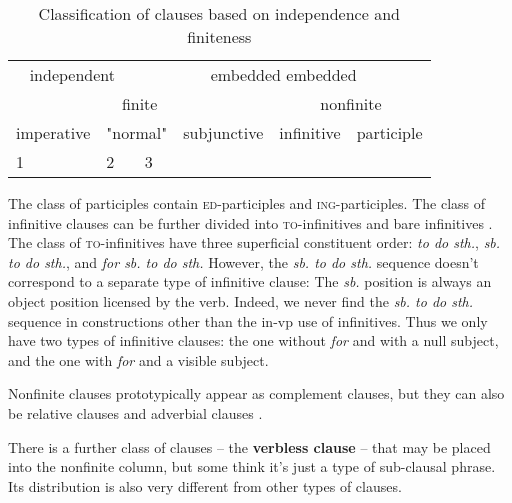 \documentclass[UTF8, a4paper, oneside, scheme=plain]{ctexrep}
\newcommand*{\citesec}[1]{\S~{#1}}
\newcommand*{\citechap}[1]{Ch~{#1}}
\newcommand*{\citepage}[1]{p.~{#1}}
\newcommand*{\concept}[1]{\textbf{#1}}
\newcommand{\corpus}[1]{\emph{#1}}
\newcommand{\corpuscat}[1]{\textsc{#1}}
\begin{document}
\begin{table}[H]
    \caption{Classification of clauses based on independence and finiteness}
    \centering
    \begin{tabular}{@{}llllll@{}}
        \toprule
        \multicolumn{2}{c}{independent}            & \multicolumn{4}{c}{embedded embedded}                                                                \\ \cmidrule(lr){1-2} \cmidrule(lr){3-6}
        \multicolumn{4}{c}{finite}                                                                & \multicolumn{2}{c}{nonfinite}                         \\ \cmidrule(lr){1-4} \cmidrule(lr){5-6}
        imperative               & \multicolumn{2}{c}{"normal"} & subjunctive & infinitive           & participle \\ \midrule
        1    &     2            &   3         &                                 &  &                                \\ \bottomrule
    \end{tabular}
\end{table}

The class of participles contain \corpuscat{ed}-participles and \corpuscat{ing}-participles.
The class of infinitive clauses can be further divided into 
\corpuscat{to}-infinitives and bare infinitives \citet[\citechap{14}, \citesec{1.4.3}]{cgel}.
The class of \corpuscat{to}-infinitives have three superficial constituent order:
\corpus{to do sth.}, \corpus{sb. to do sth.}, and \corpus{for sb. to do sth.}
However, the \corpus{sb. to do sth.} sequence doesn't correspond to a separate type of infinitive clause:
The \corpus{sb.} position is always an object position licensed by the verb.
Indeed, we never find the \corpus{sb. to do sth.} sequence
in constructions other than the in-\acs{vp} use of infinitives.
Thus we only have two types of infinitive clauses:
the one without \corpus{for} and with a null subject,
and the one with \corpus{for} and a visible subject.

Nonfinite clauses prototypically appear as complement clauses, 
but they can also be relative clauses and adverbial clauses \citep[\citepage{1264}]{cgel}.

There is a further class of clauses -- the \concept{verbless clause} \citep[\citepage{1266}]{cgel} -- 
that may be placed into the nonfinite column,
but some think it's just a type of sub-clausal phrase.
Its distribution is also very different from other types of clauses.
\end{document}
